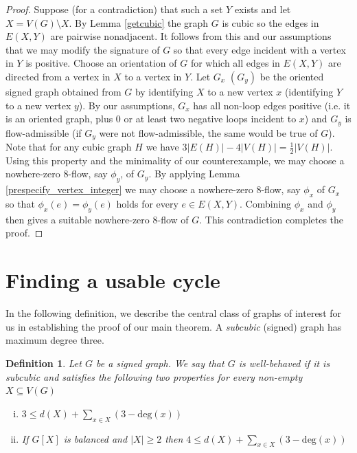 \documentclass[12pt]{article}
\newtheorem{definition}[theorem]{Definition}
\begin{document}
\begin{proof}
    Suppose (for a contradiction) that such a set $Y$ exists and let $X = V(G) \setminus X$.  By Lemma \ref{getcubic} the graph $G$ is cubic so the edges in $E(X,Y)$ are pairwise nonadjacent.  It follows from this and our assumptions that we may modify the signature of $G$ so that every edge incident with a vertex in $Y$ is positive.  Choose an orientation of $G$ for which all edges in $E(X,Y)$ are directed from a vertex in $X$ to a vertex in $Y$.  Let $G_x$ $(G_y)$ be the oriented signed graph obtained from $G$ by identifying $X$ to a new vertex $x$ (identifying $Y$ to a new vertex $y$).  By our assumptions, $G_x$ has all {non-loop} edges positive {(i.e. it is an oriented graph, plus 0 or at least two negative loops incident to $x$)} and $G_y$ is flow-admissible (if $G_y$ were not flow-admissible, the same would be true of $G$).  Note that for any cubic graph $H$ we have $3|E(H)| - 4 |V(H)| = \frac{1}{2}|V(H)|$.  Using this property and the minimality of our counterexample, we may choose a nowhere-zero 8-flow, say $\phi_y$, of $G_y$.  By applying Lemma \ref{prespecify_vertex_integer} we may choose a nowhere-zero 8-flow, say $\phi_x$ of $G_x$ so that $\phi_x(e) = \phi_y(e)$ holds for every $e \in E(X,Y)$.  Combining $\phi_x$ and $\phi_y$ then gives a suitable nowhere-zero 8-flow of $G$.  This contradiction completes the proof.
    \end{proof}

\section{Finding a usable cycle}\label{3ec usable cycle}

In the following definition, we describe the central class of graphs of interest for us in establishing the proof of our main theorem. A \emph{subcubic} (signed) graph has maximum degree three.  

\begin{definition}
    Let $G$ be a signed graph.  We say that $G$ is \emph{well-behaved} if it is subcubic and satisfies the following two properties for every non-empty $X \subseteq V(G)$
\begin{enumerate}[(i)]
    \item $3 \le d(X) + \sum_{x \in X} (3 - \mathrm{deg}(x) )$
    \item If $G[X]$ is balanced and $|X| \ge 2$ then $4 \le d(X) + \sum_{x \in X} (3 - \mathrm{deg}(x) )$
\end{enumerate}
\end{definition}
\end{document}
